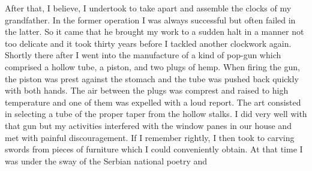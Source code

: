 \documentclass[a4paper,12pt,english,twoside,openright]{memoir}
\begin{document}
	After that, I believe, I undertook to take apart and assemble the clocks of my grandfather.  In the 
	former operation I was always successful but often failed in the latter.  So it came that he brought 
	my work to a sudden halt in a manner not too delicate and it took thirty years before I tackled 
	another clockwork again.  Shortly there after I went into the manufacture of a kind of pop-gun 
	which comprised a hollow tube, a piston, and two plugs of hemp.  When firing the gun, the piston 
	was prest against the stomach and the tube was pushed back quickly with both hands.  The air 
	between the plugs was comprest and raised to high temperature and one of them was expelled 
	with a loud report.  The art consisted in selecting a tube of the proper taper from the hollow stalks.  
	I did very well with that gun but my activities interfered with the window panes in our house and 
	met with painful discouragement.  If I remember rightly, I then took to carving swords from pieces 
	of furniture which I could conveniently obtain.  At that time I was under the sway of the Serbian 
	national poetry and 
	
\end{document}
